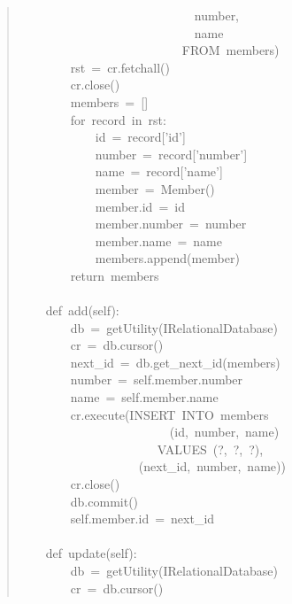 \documentclass[14pt,a4paper,openany,twoside,final]{extbook}
\begin{document}
\begin{quote}
{~~~~~~~~~~~~~~~~~~~~~~~~~~~~number,\\
~~~~~~~~~~~~~~~~~~~~~~~~~~~~name\\
~~~~~~~~~~~~~~~~~~~~~~~~~~FROM~members\textquotedbl{}\textquotedbl{}\textquotedbl{})\\
~~~~~~~~rst~=~cr.fetchall()\\
~~~~~~~~cr.close()\\
~~~~~~~~members~=~{[}{]}\\
~~~~~~~~for~record~in~rst:\\
~~~~~~~~~~~~id~=~record{[}'id'{]}\\
~~~~~~~~~~~~number~=~record{[}'number'{]}\\
~~~~~~~~~~~~name~=~record{[}'name'{]}\\
~~~~~~~~~~~~member~=~Member()\\
~~~~~~~~~~~~member.id~=~id\\
~~~~~~~~~~~~member.number~=~number\\
~~~~~~~~~~~~member.name~=~name\\
~~~~~~~~~~~~members.append(member)\\
~~~~~~~~return~members\\
~\\
~~~~def~add(self):\\
~~~~~~~~db~=~getUtility(IRelationalDatabase)\\
~~~~~~~~cr~=~db.cursor()\\
~~~~~~~~next\_id~=~db.get\_next\_id(\textquotedbl{}members\textquotedbl{})\\
~~~~~~~~number~=~self.member.number\\
~~~~~~~~name~=~self.member.name\\
~~~~~~~~cr.execute(\textquotedbl{}\textquotedbl{}\textquotedbl{}INSERT~INTO~members\\
~~~~~~~~~~~~~~~~~~~~~~~~(id,~number,~name)\\
~~~~~~~~~~~~~~~~~~~~~~VALUES~(?,~?,~?)\textquotedbl{}\textquotedbl{}\textquotedbl{},\\
~~~~~~~~~~~~~~~~~~~(next\_id,~number,~name))\\
~~~~~~~~cr.close()\\
~~~~~~~~db.commit()\\
~~~~~~~~self.member.id~=~next\_id\\
~\\
~~~~def~update(self):\\
~~~~~~~~db~=~getUtility(IRelationalDatabase)\\
~~~~~~~~cr~=~db.cursor()\\
}
\end{quote}
\end{document}

